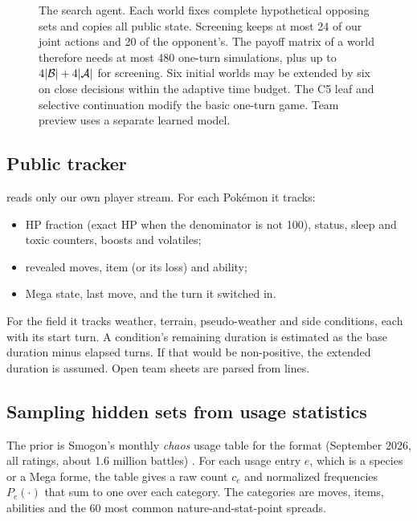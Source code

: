 \begin{figure}[htbp]
{}
\caption{The search agent. Each world fixes complete hypothetical opposing
sets and copies all public state. Screening keeps at most 24 of our joint
actions and 20 of the opponent's. The payoff matrix of a world therefore needs
at most 480 one-turn simulations, plus up to $4|\mathcal{B}|+4|\mathcal{A}|$ for screening. Six initial worlds may be extended by six on close decisions within the
adaptive time budget. The C5 leaf and selective continuation modify the basic
one-turn game. Team preview uses a separate learned model.}
\label{fig:search}
\end{figure}

\subsection{Public tracker}
 reads only our own player stream. For each
Pok\'{e}mon it tracks:
\begin{itemize}
  \item HP fraction (exact HP when the denominator is not 100), status, sleep
    and toxic counters, boosts and volatiles;
  \item revealed moves, item (or its loss) and ability;
  \item Mega state, last move, and the turn it switched in.
\end{itemize}
For the field it tracks weather, terrain, pseudo-weather and side conditions,
each with its start turn. A condition's remaining duration is estimated as
the base duration minus elapsed turns. If that would be non-positive, the
extended duration is assumed. Open team sheets are parsed from
 lines.

\subsection{Sampling hidden sets from usage statistics}
\label{sec:prior}
The prior is Smogon's monthly \emph{chaos} usage table for the format
(September 2026, all ratings, about 1.6 million battles)
\citep{smogonstats}. For each usage entry $e$, which is a species or a Mega
forme, the table gives a raw count $c_e$ and normalized frequencies
$P_e(\cdot)$ that sum to one over each category. The categories are moves,
items, abilities and the 60 most common nature-and-stat-point spreads.

